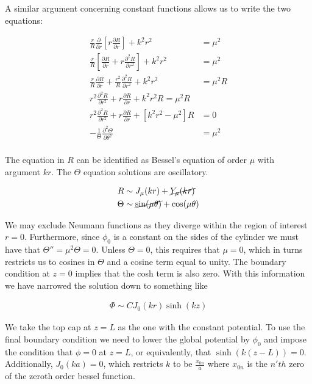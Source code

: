 \documentclass[paper=a4, fontsize=11pt]{scrartcl} %
\numberwithin{equation}{section} %
\numberwithin{figure}{section} %
\numberwithin{table}{section} %
\begin{document}
A similar argument concerning constant functions allows us to write the two equations:

\begin{align}
\frac{r}{R}\frac{\partial}{\partial r}\left[r\frac{\partial R}{\partial r}\right] + k^2r^2 &= \mu^2 \\
\frac{r}{R}\left[\frac{\partial R}{\partial r} + r\frac{\partial^2 R}{\partial r^2}\right] + k^2 r^2 &= \mu^2 \\
\frac{r}{R}\frac{\partial R}{\partial r} + \frac{r^2}{R}\frac{\partial^2 R}{\partial r^2} + k^2 r^2 &= \mu^2R \\
r^2 \frac{\partial^2 R}{\partial r^2} + r \frac{\partial R}{\partial r} + k^2 r^2 R = \mu^2R \\
r^2 \frac{\partial^2 R}{\partial r^2} + r \frac{\partial R}{\partial r} + [k^2 r^2 - \mu^2]R &= 0 \\
-\frac{1}{\Theta}\frac{\partial^2 \Theta}{\partial \theta^2} &= \mu^2 \\
\end{align}

The equation in $R$ can be identified as Bessel's equation of order $\mu$ with argument $kr$. The $\Theta$ equation solutions are oscillatory.

\begin{align}
R &\sim J_{\mu}(kr) + \cancel{Y_\mu(kr)} \\
\Theta &\sim \cancel{\sin(\mu\theta)}+ \cos(\mu\theta) \\
\end{align}   

We may exclude Neumann functions as they diverge within the region of interest $r=0$. Furthermore, since $\phi_0$ is a constant on the sides of the cylinder we must have that $\Theta'' = \mu^2\Theta = 0$. Unless $\Theta = 0$, this requires that $\mu = 0$, which in turns restricts us to cosines in $\Theta$ and a cosine term equal to unity. The boundary condition at $z=0$ implies that the cosh term is also zero. With this information we have narrowed the solution down to something like

\begin{align}
\Phi \sim CJ_0(kr)\sinh(kz)
\end{align}

We take the top cap at $z=L$ as the one with the constant potential. To use the final boundary condition we need to lower the global potential by $\phi_0$ and impose the condition that $\phi = 0$ at $z=L$, or equivalently, that $\sinh(k(z-L)) = 0$. Additionally, $J_0(ka) = 0$, which restricts $k$ to be $\frac{x_{0n}}{a}$ where $x_{0n}$ is the $n'th$ zero of the zeroth order bessel function. 
\end{document}
